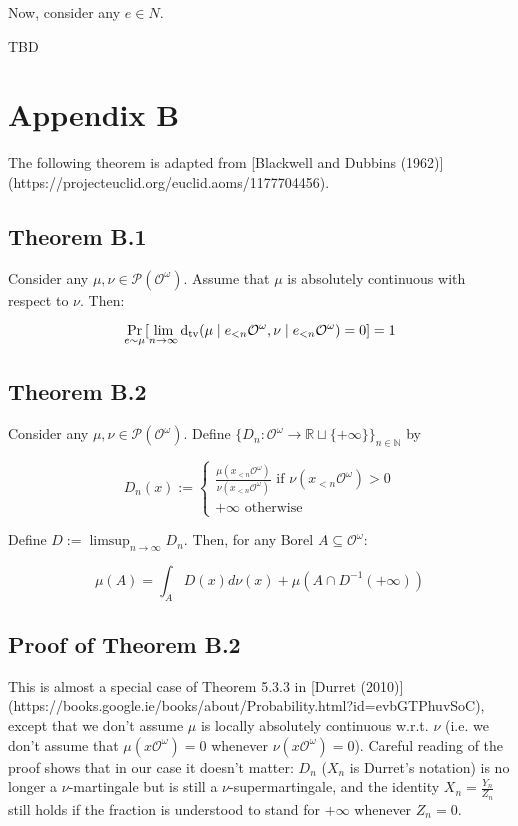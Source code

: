 \documentclass[a4paper]{article}
\DeclareMathOperator{\Prb}{Pr}
\newcommand{\Dtv}{\operatorname{d}_{\textnormal{tv}}}
\newcommand{\Nats}{\mathbb{N}}
\newcommand{\Reals}{\mathbb{R}}
\newcommand{\Prob}{\mathcal{P}}
\newcommand{\Obs}{\mathcal{O}}
\newcommand{\ObsO}{\Obs^\omega}
\begin{document}
Now, consider any ${e \in N}$.

TBD

\section{Appendix B}

The following theorem is adapted from [Blackwell and Dubbins (1962)](https://projecteuclid.org/euclid.aoms/1177704456).

\subsection{Theorem B.1}

Consider any ${\mu, \nu \in \Prob(\ObsO)}$. Assume that ${\mu}$ is absolutely continuous with respect to ${\nu}$. Then:

$$\Prb_{e \sim \mu}[\lim_{n \rightarrow \infty} \Dtv(\mu \mid e_{<n}\ObsO, \nu \mid e_{<n}\ObsO) = 0] = 1$$

\subsection{Theorem B.2}

Consider any ${\mu, \nu \in \Prob(\ObsO)}$. Define ${\{D_n: \ObsO \rightarrow \Reals \sqcup \{+\infty\}\}_{n \in \Nats}}$ by

$$D_n(x):=\begin{cases}\frac{\mu(x_{<n}\ObsO)}{\nu(x_{<n}\ObsO)} \text{ if } \nu(x_{<n}\ObsO) > 0\\+\infty \text{ otherwise}\end{cases}$$

Define ${D:= \limsup_{n \rightarrow \infty} D_n}$. Then, for any Borel ${A \subseteq \ObsO}$:

$$\mu(A) = \int_A D(x) d\nu(x) + \mu(A \cap D^{-1}(+\infty))$$

\subsection{Proof of Theorem B.2}

This is almost a special case of Theorem 5.3.3 in [Durret (2010)](https://books.google.ie/books/about/Probability.html?id=evbGTPhuvSoC), except that we don't assume ${\mu}$ is locally absolutely continuous w.r.t. ${\nu}$ (i.e. we don't assume that ${\mu(x\ObsO)=0}$ whenever ${\nu(x\ObsO)=0}$). Careful reading of the proof shows that in our case it doesn't matter: ${D_n}$ (${X_n}$ is Durret's notation) is no longer a ${\nu}$-martingale but is still a ${\nu}$-supermartingale, and the identity ${X_n = \frac{Y_n}{Z_n}}$ still holds if the fraction is understood to stand for ${+\infty}$ whenever ${Z_n = 0}$.
\end{document}
